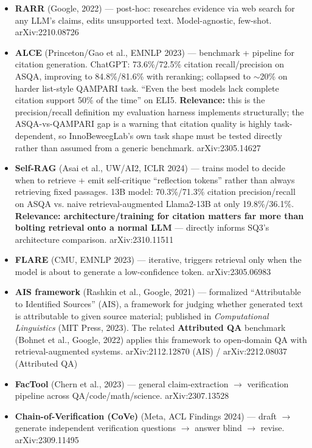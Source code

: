 \begin{itemize}
\item \textbf{RARR} (Google, 2022) — post-hoc: researches evidence via web search for any LLM's claims, edits unsupported text. Model-agnostic, few-shot. arXiv:2210.08726
\item \textbf{ALCE} (Princeton/Gao et al., EMNLP 2023) — benchmark + pipeline for citation generation. ChatGPT: 73.6\%/72.5\% citation recall/precision on ASQA, improving to 84.8\%/81.6\% with reranking; collapsed to $\sim$20\% on harder list-style QAMPARI task. \textquotedblleft{}Even the best models lack complete citation support 50\% of the time\textquotedblright{} on ELI5. \textbf{Relevance:} this is the precision/recall definition my evaluation harness implements structurally; the ASQA-vs-QAMPARI gap is a warning that citation quality is highly task-dependent, so InnoBeweegLab's own task shape must be tested directly rather than assumed from a generic benchmark. arXiv:2305.14627
\item \textbf{Self-RAG} (Asai et al., UW/AI2, ICLR 2024) — trains model to decide when to retrieve + emit self-critique \textquotedblleft{}reflection tokens\textquotedblright{} rather than always retrieving fixed passages. 13B model: 70.3\%/71.3\% citation precision/recall on ASQA vs. naive retrieval-augmented Llama2-13B at only 19.8\%/36.1\%. \textbf{Relevance: architecture/training for citation matters far more than bolting retrieval onto a normal LLM} — directly informs SQ3's architecture comparison. arXiv:2310.11511
\item \textbf{FLARE} (CMU, EMNLP 2023) — iterative, triggers retrieval only when the model is about to generate a low-confidence token. arXiv:2305.06983
\item \textbf{AIS framework} (Rashkin et al., Google, 2021) — formalized \textquotedblleft{}Attributable to Identified Sources\textquotedblright{} (AIS), a framework for judging whether generated text is attributable to given source material; published in \textit{Computational Linguistics} (MIT Press, 2023). The related \textbf{Attributed QA} benchmark (Bohnet et al., Google, 2022) applies this framework to open-domain QA with retrieval-augmented systems. arXiv:2112.12870 (AIS) / arXiv:2212.08037 (Attributed QA)
\item \textbf{FacTool} (Chern et al., 2023) — general claim-extraction $\rightarrow$ verification pipeline across QA/code/math/science. arXiv:2307.13528
\item \textbf{Chain-of-Verification (CoVe)} (Meta, ACL Findings 2024) — draft $\rightarrow$ generate independent verification questions $\rightarrow$ answer blind $\rightarrow$ revise. arXiv:2309.11495
\end{itemize}

